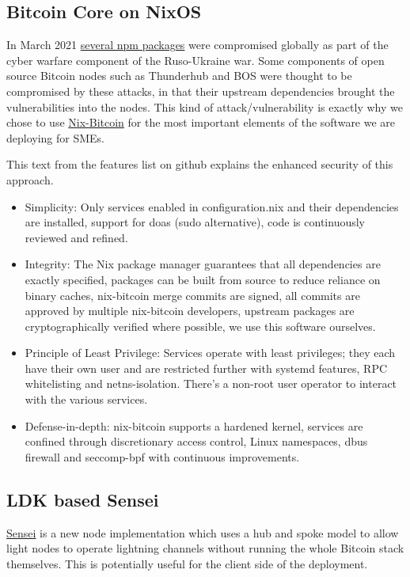 \subsection{Bitcoin Core on NixOS}
In March 2021 \href{https://www.whitesourcesoftware.com/whitesource-npm-threat-report-for-javascript-package-registry/}{several npm packages} were compromised globally as part of the cyber warfare component of the Ruso-Ukraine war. Some components of open source Bitcoin nodes such as Thunderhub and BOS were thought to be compromised by these attacks, in that their upstream dependencies brought the vulnerabilities into the nodes. This kind of attack/vulnerability is exactly why we chose to use \href{https://github.com/fort-nix/nix-bitcoin/#features}{Nix-Bitcoin} for the most important elements of the software we are deploying for SMEs.\par
This text from the features list on github explains the enhanced security of this approach.
\begin{itemize}
\item Simplicity: Only services enabled in configuration.nix and their dependencies are installed, support for doas (sudo alternative), code is continuously reviewed and refined.
\item Integrity: The Nix package manager guarantees that all dependencies are exactly specified, packages can be built from source to reduce reliance on binary caches, nix-bitcoin merge commits are signed, all commits are approved by multiple nix-bitcoin developers, upstream packages are cryptographically verified where possible, we use this software ourselves.
\item Principle of Least Privilege: Services operate with least privileges; they each have their own user and are restricted further with systemd features, RPC whitelisting and netns-isolation. There's a non-root user operator to interact with the various services.
\item Defense-in-depth: nix-bitcoin supports a hardened kernel, services are confined through discretionary access control, Linux namespaces, dbus firewall and seccomp-bpf with continuous improvements.
\end{itemize}
\subsection{LDK based Sensei}
\href{https://l2.technology/sensei}{Sensei} is a new node implementation which uses a hub and spoke model to allow light nodes to operate lightning channels without running the whole Bitcoin stack themselves. This is potentially useful for the client side of the deployment.
